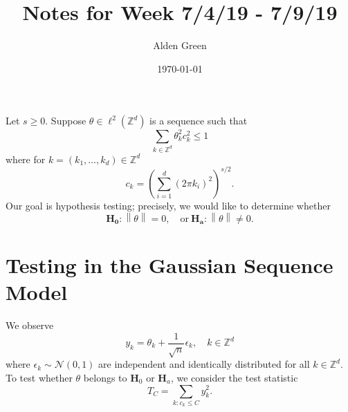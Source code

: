 \documentclass{article}
\newcommand{\norm}[1]{\left\lVert#1\right\rVert}
\newcommand{\1}{\mathbb{I}}
\theoremstyle{alden}
\theoremstyle{aldenthm}
\theoremstyle{definition}
\theoremstyle{remark}
\begin{document}
\title{Notes for Week 7/4/19 - 7/9/19}
\author{Alden Green}
\date{\today}
\maketitle

Let $s \geq 0$. Suppose $\theta \in \ell^2(\mathbb{Z}^d)$ is a sequence such that
\begin{equation*}
\sum_{k \in \mathbb{Z}^d} \theta_k^2 c_k^2 \leq 1
\end{equation*}
where for $k = (k_1, \ldots, k_d) \in \mathbb{Z}^d$
\begin{equation*}
c_k = \left(\sum_{i = 1}^{d} (2\pi k_i)^2\right)^{s/2}.
\end{equation*}
Our goal is hypothesis testing; precisely, we would like to determine whether
\begin{equation*}
\mathbf{H_0}: \norm{\theta} = 0, \quad \textrm{or}~ \mathbf{H_a}: \norm{\theta} \neq 0.
\end{equation*}

\section{Testing in the Gaussian Sequence Model}

We observe
\begin{equation*}
y_k = \theta_k + \frac{1}{\sqrt{n}}\epsilon_k, \quad k \in \mathbb{Z}^d
\end{equation*}
where $\epsilon_k \sim \mathcal{N}(0,1)$ are independent and identically distributed for all $k \in \mathbb{Z}^d$. To test whether $\theta$ belongs to $\mathbf{H}_0$ or $\mathbf{H}_a$, we consider the test statistic
\begin{equation*}
T_C = \sum_{k: c_k \leq C} y_k^2.
\end{equation*}
\end{document}
